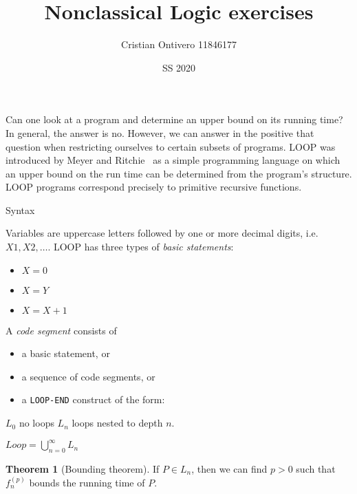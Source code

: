 \documentclass [10pt]{article}
\title{Nonclassical Logic exercises}
\author{Cristian Ontivero 11846177}
\date{SS 2020}
\theoremstyle{definition}
\newtheorem{theorem}{Theorem}
\begin{document}
\maketitle

Can one look at a program and determine an upper bound on its running time?
In general, the answer is no. However, we can answer in the positive that
question when restricting ourselves to certain subsets of programs.
LOOP was introduced by Meyer and Ritchie~\cite{MR67} as a simple programming
language on which an upper bound on the run time can be determined from the program's structure.
LOOP programs correspond precisely to primitive recursive functions.

Syntax

Variables are
uppercase letters followed by one or more decimal digits, i.e.
\(X1,X2,\dots\). LOOP has three types of \textit{basic statements}:
\begin{itemize}
  \item \(X = 0\)
  \item \(X = Y\)
  \item \(X = X + 1\)
\end{itemize}
A \textit{code segment} consists of
\begin{itemize}
  \item a basic statement, or
  \item a sequence of code segments, or
  \item a \texttt{LOOP-END} construct of the form:
\end{itemize}

\(L_0\) no loops
\(L_n\) loops nested to depth \(n\).

\(Loop = \bigcup_{n=0}^{\infty} L_n\)

\begin{theorem}[Bounding theorem]
  If \(P \in L_n\), then we can find \(p>0\) such that \(f^{(p)}_n\) bounds
  the running time of \(P\).
\end{theorem}
%
\end{document}
